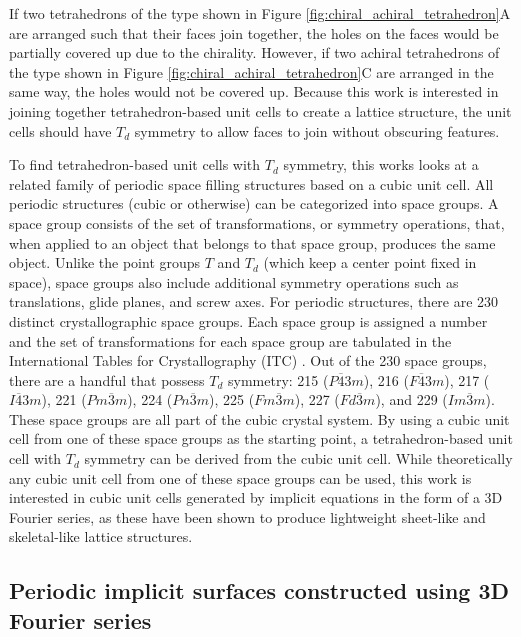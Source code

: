 \documentclass{article}
\begin{document}
If two tetrahedrons of the type shown in Figure \ref{fig:chiral_achiral_tetrahedron}A are arranged such that their faces join together, the holes on the faces would be partially covered up due to the chirality. However, if two achiral tetrahedrons of the type shown in Figure \ref{fig:chiral_achiral_tetrahedron}C are arranged in the same way, the holes would not be covered up. Because this work is interested in joining together tetrahedron-based unit cells to create a lattice structure, the unit cells should have $T_d$ symmetry to allow faces to join without obscuring features.

To find tetrahedron-based unit cells with $T_d$ symmetry, this works looks at a related family of periodic space filling structures based on a cubic unit cell. All periodic structures (cubic or otherwise) can be categorized into space groups. A space group consists of the set of transformations, or symmetry operations, that, when applied to an object that belongs to that space group, produces the same object. Unlike the point groups $T$ and $T_d$ (which keep a center point fixed in space), space groups also include additional symmetry operations such as translations, glide planes, and screw axes. For periodic structures, there are 230 distinct crystallographic space groups. Each space group is assigned a number and the set of transformations for each space group are tabulated in the International Tables for Crystallography (ITC) \cite{hahn1983international}. Out of the 230 space groups, there are a handful that possess $T_d$ symmetry: 215 ($P\overline{4}3m$), 216 ($F\overline{4}3m$), 217 ($I\overline{4}3m$), 221 ($Pm\overline{3}m$), 224 ($Pn\overline{3}m$), 225 ($Fm\overline{3}m$), 227 ($Fd\overline{3}m$), and 229 ($Im\overline{3}m$). These space groups are all part of the cubic crystal system. By using a cubic unit cell from one of these space groups as the starting point, a tetrahedron-based unit cell with $T_d$ symmetry can be derived from the cubic unit cell. While theoretically any cubic unit cell from one of these space groups can be used, this work is interested in cubic unit cells generated by implicit equations in the form of a 3D Fourier series, as these have been shown to produce lightweight sheet-like and skeletal-like lattice structures.

\subsection{Periodic implicit surfaces constructed using 3D Fourier series}
\label{sec:fourier}
\end{document}
